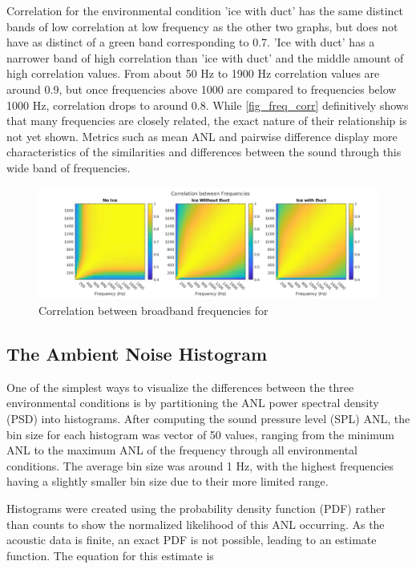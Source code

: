 Correlation for the environmental condition 'ice with duct' has the same distinct bands of low correlation at low frequency as the other two graphs, but does not have as distinct of a green band corresponding to 0.7. 'Ice with duct' has a narrower band of high correlation than 'ice with duct' and the middle amount of high correlation values. From about 50 Hz to 1900 Hz correlation values are around 0.9, but once frequencies above 1000 are compared to frequencies below 1000 Hz, correlation drops to around 0.8. While \autoref{fig_freq_corr} definitively shows that many frequencies are closely related, the exact nature of their relationship is not yet shown. Metrics such as mean ANL and pairwise difference display more characteristics of the similarities and differences between the sound through this wide band of frequencies.

\begin{figure}[ht]
\centering
\includegraphics[scale=0.38]{Figures/corr_all_1x3.jpg}
\caption{Correlation between broadband frequencies for }
\label{fig_freq_corr}
\end{figure}

\subsection{The Ambient Noise Histogram} \label{sec_hist}
One of the simplest ways to visualize the differences between the three environmental conditions is by partitioning the ANL power spectral density (PSD) into histograms. After computing the sound pressure level (SPL) ANL, the bin size for each histogram was vector of 50 values, ranging from the minimum ANL to the maximum ANL of the frequency through all environmental conditions. The average bin size was around 1 Hz, with the highest frequencies having a slightly smaller bin size due to their more limited range. %

Histograms were created using the probability density function (PDF) rather than counts to show the normalized likelihood of this ANL occurring. As the acoustic data is finite, an exact PDF is not possible, leading to an estimate function. The equation for this estimate is

